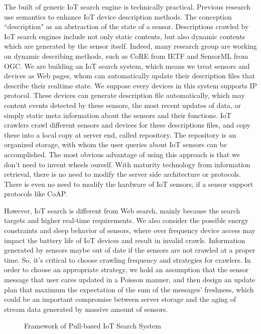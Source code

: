 \documentclass[conference]{IEEEtran}
\begin{document}
The built of generic IoT search engine is technically practical. Previous research use semantics\cite{Pfisterer2011} to enhance IoT device description methods. The conception ``description" as an abstraction of the state of a sensor.
Descriptions crawled by IoT search engines include not only static contents, but also dynamic contents which are generated by the sensor itself. Indeed, many research group are working on dynamic describing methods, such as CoRE\cite{CoREWorkingGroup2012} from IETF and SensorML\cite{botts2007opengis} from OGC. 
We are building an IoT search system, which means we treat sensors and devices as Web pages, whom can automatically update their description files that describe their realtime state.
We suppose every devices in this system supports IP protocol. These devices can generate description file automatically, which may content events detected by these sensors, the most recent updates of data, or simply static meta information about the sensors and their functions. 
IoT crawlers crawl different sensors and devices for these descriptions files, and copy these into a local copy at server end, called repository. The repository is an organized storage, with whom the user queries about IoT sensors can be accomplished.
The most obvious advantage of using this approach is that we don't need to invent wheels ourself. With maturity technology from information retrieval, there is no need to modify the server side architecture or protocols. There is even no need to modify the hardware of IoT sensors, if a sensor support protocols like CoAP.


However, IoT search is different from Web search, mainly because the search targets and higher real-time requirements. We also consider the possible energy constraints and sleep behavior of sensors, where over frequency device access may impact the battery life of IoT devices and result in invalid crawls. Information generated by sensors maybe out of date if the sensors are not crawled at a proper time. So, it's critical to choose crawling frequency and strategies for crawlers. 
In order to choose an appropriate strategy, we hold an assumption that the sensor message that user cares updated in a Poisson manner, and then design an update plan that maximum the expectation of the sum of the messages' freshness, which could be an important compromise between server storage and the aging of stream data generated by massive amount of sensors.

\begin{figure}
	\centering
	
	\captionsetup{justification=centering}
	\caption{Framework of Pull-based IoT Search System}
	\label{fig:framework}
\end{figure}
\end{document}
